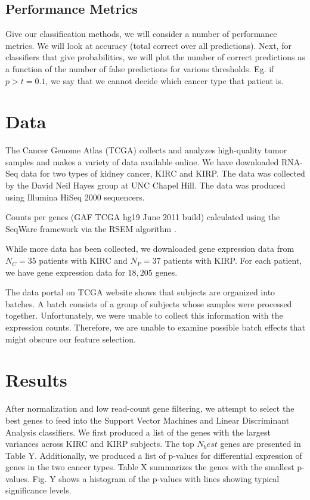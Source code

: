 \subsection{Performance Metrics}

Give our classification methods, we will consider a number of performance
metrics. We will look at accuracy (total correct over all predictions). Next,
for classifiers that give probabilities, we will plot the number of correct
predictions as a function of the number of false predictions for various
thresholds. Eg. if $p>t=0.1$, we say that we cannot decide which cancer type
that patient is. 

\section{Data}

The Cancer Genome Atlas (TCGA) collects and analyzes high-quality tumor samples
and makes a variety of data available online. We have downloaded RNA-Seq data
for two types of kidney cancer, KIRC and KIRP. The data was collected by the David
Neil Hayes group at UNC Chapel Hill. The data was produced using Illumina HiSeq
2000 sequencers. 

Counts per genes (GAF TCGA hg19 June 2011 build) calculated using the SeqWare
framework via the RSEM algorithm \cite{li2011rsem}.

While more data has been collected, we downloaded gene expression data from
$N_C =35$ patients with KIRC and $N_P = 37$ patients with KIRP.  For each
patient, we have gene expression data for $18,205$ genes. 

The data portal on TCGA website shows that subjects are organized into batches. A batch consists of
a group of subjects whose samples were processed together. Unfortunately,
we were unable to collect this information with the expression counts. Therefore, we are 
unable to examine possible batch effects that might obscure our feature selection. 

\section{Results}

After normalization and low read-count gene filtering, we attempt to select the best
genes to feed into the Support Vector Machines and Linear Discriminant Analysis classifiers.
We first produced a list of the genes with the largest variances across KIRC and KIRP subjects.
The top $N_best$ genes are presented in Table Y. Additionally, we produced a list of p-values
 for differential expression of genes in the two cancer types. Table X summarizes the genes with 
 the smallest p-values. Fig. Y shows a histogram of the p-values with lines showing typical 
 significance levels. 
 
